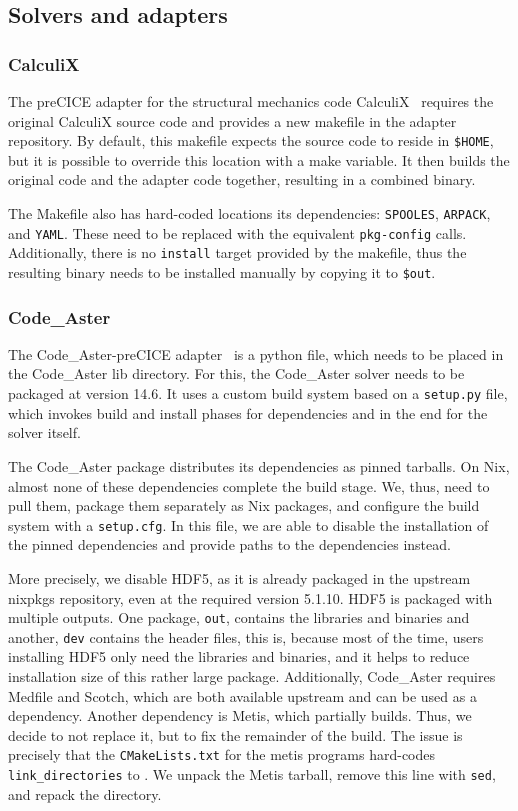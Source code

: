 \documentclass{eceasst}
\begin{document}
\subsection{Solvers and adapters}

\subsubsection{CalculiX}

The preCICE adapter for the structural mechanics code CalculiX~\cite{Uekermann2017_Adapters} requires the original CalculiX source code and provides a new makefile in the adapter repository.
By default, this makefile expects the source code to reside in \texttt{\$HOME}, but it is possible to override this location with a make variable.
It then builds the original code and the adapter code together, resulting in a combined binary.

The Makefile also has hard-coded locations its dependencies: \texttt{SPOOLES}, \texttt{ARPACK}, and \texttt{YAML}. These need to be replaced with the equivalent \texttt{pkg-config} calls.
Additionally, there is no \texttt{install} target provided by the makefile, thus the resulting binary needs to be installed manually by copying it to \texttt{\$out}.

\subsubsection{Code\_Aster}

The Code\_Aster-preCICE adapter~\cite{Uekermann2017_Adapters} is a python file, which needs to be placed in the Code\_Aster lib directory.
For this, the Code\_Aster solver needs to be packaged at version 14.6.
It uses a custom build system based on a \texttt{setup.py} file, which invokes build and install phases for dependencies and in the end for the solver itself.

The Code\_Aster package distributes its dependencies as pinned tarballs.
On Nix, almost none of these dependencies complete the build stage. We, thus, need to pull them, package them separately as Nix packages, and configure the build system with a \texttt{setup.cfg}.
In this file, we are able to disable the installation of the pinned dependencies and provide paths to the dependencies instead.

More precisely, we disable HDF5, as it is already packaged in the upstream nixpkgs repository, even at the required version 5.1.10.
HDF5 is packaged with multiple outputs.
One package, \texttt{out}, contains the libraries and binaries and another, \texttt{dev} contains the header files, this is, because most of the time, users installing HDF5 only need the libraries and binaries, and it helps to reduce installation size of this rather large package.
Additionally, Code\_Aster requires Medfile and Scotch, which are both available upstream and can be used as a dependency.
Another dependency is Metis, which partially builds. Thus, we decide to not replace it, but to fix the remainder of the build.
The issue is precisely that the \texttt{CMakeLists.txt} for the metis programs hard-codes \texttt{link\_directories} to . We unpack the Metis tarball, remove this line with \texttt{sed}, and repack the directory.
\end{document}
